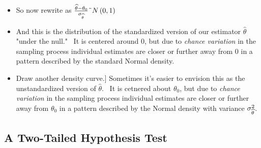 \documentclass[11pt]{article}
\begin{document}
\begin{itemize}
\begin{itemize}
\item So now rewrite as $\frac{\widehat{\theta }-\theta _{0}}{\sigma _{%
\widehat{\theta }}}\symbol{126}N\left( 0,1\right) $

\item And this is the distribution of the standardized version of our
estimator $\widehat{\theta }$ "under the null." \ It is centered around 0,
but due to \textit{chance variation} in the sampling process individual
estimates are closer or further away from $0$ in a pattern described by the
standard Normal density.

\item \lbrack Draw another density curve.] Sometimes it's easier to envision
this as the unstandardized version of $\widehat{\theta }.$ \ It is cetnered
about $\theta _{0}$, but due to \textit{chance variation} in the sampling
process individual estimates are closer or further away from $\theta _{0}$
in a pattern described by the Normal density with variance $\sigma _{%
\widehat{\theta }}^{2}$.
\end{itemize}
\end{itemize}

\subsection{A Two-Tailed Hypothesis Test}
\end{document}
